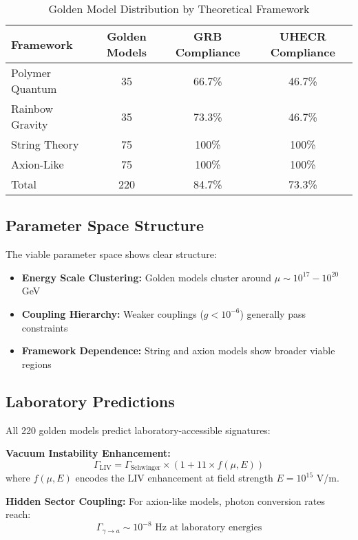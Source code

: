 \documentclass[12pt]{article}
\begin{document}
\begin{table}[h]
\centering
\caption{Golden Model Distribution by Theoretical Framework}
\begin{tabular}{lccc}
\toprule
Framework & Golden Models & GRB Compliance & UHECR Compliance \\
\midrule
Polymer Quantum & 35 & 66.7\% & 46.7\% \\
Rainbow Gravity & 35 & 73.3\% & 46.7\% \\
String Theory & 75 & 100\% & 100\% \\
Axion-Like & 75 & 100\% & 100\% \\
\midrule
Total & 220 & 84.7\% & 73.3\% \\
\bottomrule
\end{tabular}
\end{table}

\subsection{Parameter Space Structure}

The viable parameter space shows clear structure:
\begin{itemize}
\item \textbf{Energy Scale Clustering:} Golden models cluster around $\mu \sim 10^{17} - 10^{20}$ GeV
\item \textbf{Coupling Hierarchy:} Weaker couplings ($g < 10^{-6}$) generally pass constraints
\item \textbf{Framework Dependence:} String and axion models show broader viable regions
\end{itemize}

\subsection{Laboratory Predictions}

All 220 golden models predict laboratory-accessible signatures:

\textbf{Vacuum Instability Enhancement:}
\begin{equation}
\Gamma_{\text{LIV}} = \Gamma_{\text{Schwinger}} \times (1 + 11 \times f(\mu, E))
\end{equation}
where $f(\mu, E)$ encodes the LIV enhancement at field strength $E = 10^{15}$ V/m.

\textbf{Hidden Sector Coupling:}
For axion-like models, photon conversion rates reach:
\begin{equation}
\Gamma_{\gamma \to a} \sim 10^{-8} \text{ Hz at laboratory energies}
\end{equation}
\end{document}
